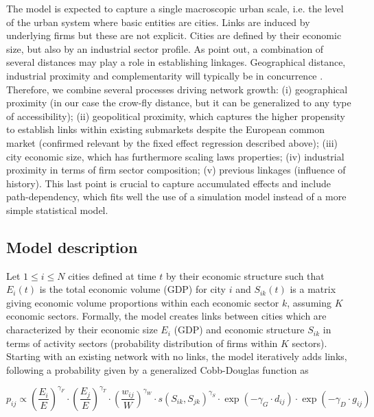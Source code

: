 \documentclass[11pt]{article}
\begin{document}
The model is expected to capture a single macroscopic urban scale, i.e. the level of the urban system where basic entities are cities. Links are induced by underlying firms but these are not explicit. Cities are defined by their economic size, but also by an industrial sector profile. As \cite{martinus2018global} point out, a combination of several distances may play a role in establishing linkages. Geographical distance, industrial proximity and complementarity will typically be in concurrence \cite{cottineau2020nested}. Therefore, we combine several processes driving network growth: (i) geographical proximity (in our case the crow-fly distance, but it can be generalized to any type of accessibility); (ii) geopolitical proximity, which captures the higher propensity to establish links within existing submarkets despite the European common market (confirmed relevant by the fixed effect regression described above); (iii) city economic size, which has furthermore scaling laws properties; (iv) industrial proximity in terms of firm sector composition; (v) previous linkages (influence of history). This last point is crucial to capture accumulated effects and include path-dependency, which fits well the use of a simulation model instead of a more simple statistical model.



\subsection{Model description}

Let $1 \leq i \leq N$ cities defined at time $t$ by their economic structure such that $E_i(t)$ is the total economic volume (GDP) for city $i$ and $S_{ik}(t)$ is a matrix giving economic volume proportions within each economic sector $k$, assuming $K$ economic sectors. Formally, the model creates links between cities which are characterized by their economic size $E_i$ (GDP) and economic structure $S_{ik}$ in terms of activity sectors (probability distribution of firms within $K$ sectors). Starting with an existing network with no links, the model iteratively adds links, following a probability given by a generalized Cobb-Douglas function \cite{vilcu2011geometric} as 

\begin{equation}
p_{ij} \propto \left(\frac{E_{i}}{E}\right)^{\gamma_F} \cdot \left(\frac{E_{j}}{E}\right)^{\gamma_T} \cdot \left(\frac{w_{ij}}{W}\right)^{\gamma_W} \cdot s\left(S_{ik},S_{jk}\right)^{\gamma_S} \cdot \exp \left(- \gamma_G \cdot d_{ij}\right) \cdot \exp \left(- \gamma_D \cdot g_{ij}\right)
\end{equation}
\end{document}
